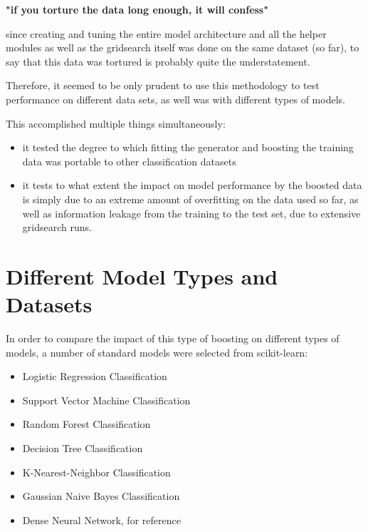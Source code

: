 \begin{center} 
	
	\textbf{"if you torture the data long enough, it will confess" }

\end{center}

since creating and tuning the entire model architecture and all the helper modules as well as the gridsearch itself was done on the same dataset (so far), to say that this data was tortured is probably quite the understatement.

Therefore, it seemed to be only prudent to use this methodology to test performance on different data sets, as well was with different types of models.

This accomplished multiple things simultaneously:

\begin{itemize}
	\item it tested the degree to which fitting the generator and boosting the training data was portable to other classification datasets
	\item it tests to what extent the impact on model performance by the boosted data is simply due to an extreme amount of overfitting on the data used so far, as well as information leakage from the training to the test set, due to extensive gridsearch runs.
\end{itemize}

\clearpage

\section{Different Model Types and Datasets}

In order to compare the impact of this type of boosting on different types of models, a number of standard models were selected from scikit-learn:

\begin{itemize}
	\item Logistic Regression Classification
	\item Support Vector Machine Classification
	\item Random Forest Classification
	\item Decision Tree Classification
	\item K-Nearest-Neighbor Classification
	\item Gaussian Naive Bayes Classification
	\item Dense Neural Network, for reference
\end{itemize}

